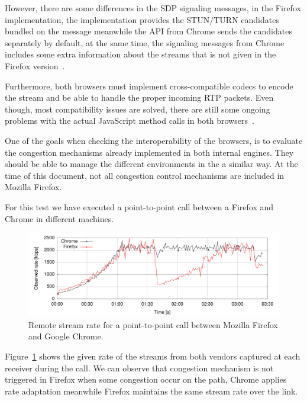 However, there are some differences in the SDP signaling messages, in the Firefox implementation, the implementation provides the STUN/TURN candidates bundled on the message meanwhile the API from Chrome sends the candidates separately by default, at the same time, the signaling messages from Chrome includes some extra information about the streams that is not given in the Firefox version~\cite{interopnotes}.

Furthermore, both browsers must implement cross-compatible codecs to encode the stream and be able to handle the proper incoming RTP packets. Even though, most compatibility issues are solved, there are still some ongoing problems with the actual JavaScript method calls in both browsers~\cite{interopnotes}.

One of the goals when checking the interoperability of the browsers, is to evaluate the congestion mechanisms already implemented in both internal engines. They should be able to manage the different environments in the a similar way. At the time of this document, not all congestion control mechanisms are included in Mozilla Firefox.

For this test we have executed a point-to-point call between a Firefox and Chrome in different machines. 

\begin{figure}[h]
  \centering
    \includegraphics[width=1\textwidth]{./figures/firefoxvschrome1.pdf}
      \caption[Remote stream rate for a point-to-point call between Mozilla Firefox and Google Chrome]{Remote stream rate for a point-to-point call between Mozilla Firefox and Google Chrome.}
	\label{fig:firefoxvschrome1}
\end{figure}

Figure~\ref{fig:firefoxvschrome1} shows the given rate of the streams from both vendors captured at each receiver during the call. We can observe that congestion mechanism is not triggered in Firefox when some congestion occur on the path, Chrome applies rate adaptation meanwhile Firefox maintains the same stream rate over the link.

